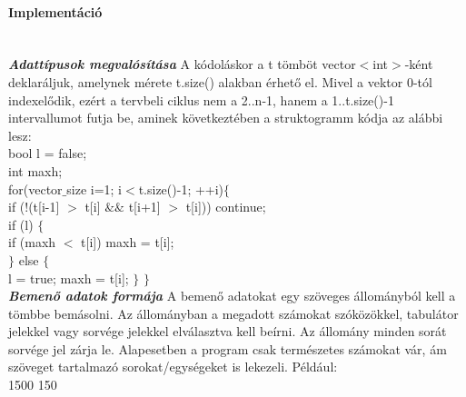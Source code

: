 \documentclass[12pt]{report}
\begin{document}
\begin{stuki}[14cm]
\begin{WHILE}{3}{}
\begin{CASE}{2}{6}
\begin{IF}{1}{}
\ELSE
{}
\end{IF}
\end{CASE}
\end{WHILE}
\end{stuki}

\paragraph{Implementáció} \hspace{0pt} \\

\textit{\textbf{Adattípusok megvalósítása}} \newline
A kódoláskor a t tömböt vector$<$int$>$-ként deklaráljuk, amelynek mérete t.size() alakban érhető el. Mivel a vektor 0-tól indexelődik, ezért a tervbeli ciklus nem a 2..n-1, hanem a 1..t.size()-1 intervallumot futja be, aminek következtében a struktogramm kódja az alábbi lesz:\\
    bool l = false; \\
    int maxh; \\
    for(vector$\_$size i=1; i$<$t.size()-1; ++i)$\lbrace$ \\
         if (!(t[i-1] $>$ t[i] $\& \&$ t[i+1] $>$ t[i])) continue; \\
         if (l) $\lbrace$ \\
             if (maxh $<$ t[i]) maxh = t[i]; \\
         $\rbrace$ else $\lbrace$ \\
             l = true; maxh = t[i]; $\rbrace$ $\rbrace$ \\

\textit{\textbf{Bemenő adatok formája}} \newline
A bemenő adatokat egy szöveges állományból kell a tömbbe bemásolni. Az állományban a megadott számokat szóközökkel, tabulátor jelekkel vagy sorvége jelekkel elválasztva kell beírni. Az állomány minden sorát sorvége jel zárja le. Alapesetben a program csak természetes számokat vár, ám szöveget tartalmazó sorokat/egységeket is lekezeli. Például:\\
1500	150  
\end{document}

